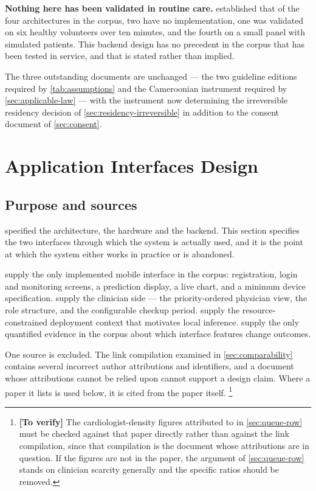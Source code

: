 \documentclass[12pt,a4paper,oneside]{report}
\newcommand{\verify}[1]{\footnote{\textbf{[To verify]} #1}}
\begin{document}
\textbf{Nothing here has been validated in routine care.}  established that of the four architectures in the corpus, two have no implementation, one was validated on six healthy volunteers over ten minutes, and the fourth on a small panel with simulated patients. This backend design has no precedent in the corpus that has been tested in service, and that is stated rather than implied.

The three outstanding documents are unchanged --- the two guideline editions required by \cref{tab:assumptions} and the Cameroonian instrument required by \cref{sec:applicable-law} --- with the instrument now determining the irreversible residency decision of \cref{sec:residency-irreversible} in addition to the consent document of \cref{sec:consent}.

\section{Application Interfaces Design}\label{sec:interfaces}

\subsection*{Purpose and sources}

 specified the architecture, the hardware and the backend. This section specifies the two interfaces through which the system is actually used, and it is the point at which the system either works in practice or is abandoned.

\Textcite{efendi2025} supply the only implemented mobile interface in the corpus: registration, login and monitoring screens, a prediction display, a live chart, and a minimum device specification. \Textcite{yazdani2018} supply the clinician side --- the priority-ordered physician view, the role structure, and the configurable checkup period. \Textcite{cadrage2026} supply the resource-constrained deployment context that motivates local inference. \Textcite{zhou2024} supply the only quantified evidence in the corpus about which interface features change outcomes.

One source is excluded. The link compilation examined in \cref{sec:comparability} contains several incorrect author attributions and identifiers, and a document whose attributions cannot be relied upon cannot support a design claim. Where a paper it lists is used below, it is cited from the paper itself.%
\verify{The cardiologist-density figures attributed to \textcite{segun2025} in \cref{sec:queue-row} must be checked against that paper directly rather than against the link compilation, since that compilation is the document whose attributions are in question. If the figures are not in the paper, the argument of \cref{sec:queue-row} stands on clinician scarcity generally and the specific ratios should be removed.}
\end{document}
